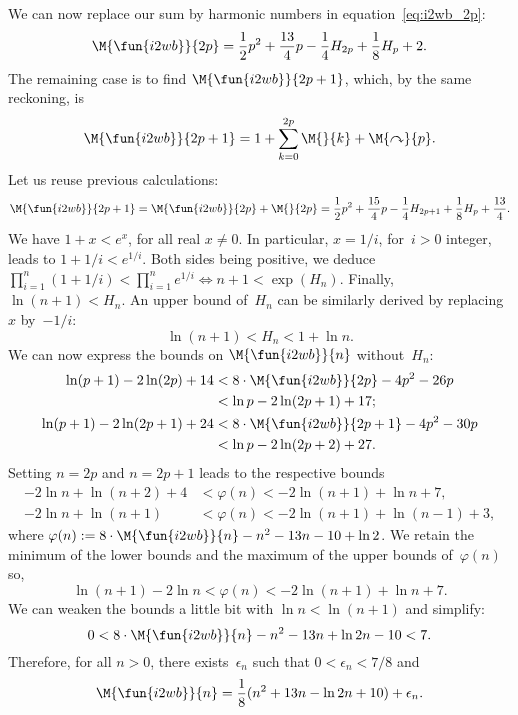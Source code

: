 We can now replace our sum by harmonic numbers in
equation~\eqref{eq:i2wb_2p}:
\begin{equation*}
\M{\fun{i2wb}}{2p}
  = \frac{1}{2}{p^2} + \frac{13}{4}{p} - \frac{1}{4}{H_{2p}}
    + \frac{1}{8}{H_p} + 2.
\end{equation*}
The remaining case is to find \(\M{\fun{i2wb}}{2p+1}\), which, by the
same reckoning, is
\begin{equation*}
\M{\fun{i2wb}}{2p+1}
  = 1 + \sum_{k=0}^{2p}{\M{}{k}} + \M{\curvearrowright}{p}.
\end{equation*}
Let us reuse previous calculations:
\begin{equation*}
\M{\fun{i2wb}}{2p+1}
   = \M{\fun{i2wb}}{2p} + \M{}{2p}
   = \frac{1}{2}{p^2} + \frac{15}{4}{p} - \frac{1}{4}{H_{2p+1}}
     + \frac{1}{8}{H_p} + \frac{13}{4}.
\end{equation*}
We have \(1 + x < e^x\), for all real \(x \neq 0\). In particular,
\(x=1/i\), for~\(i>0\) integer, leads to \(1 + 1/i < e^{1/i}\). Both
sides being positive, we deduce \(\prod_{i=1}^{n}(1+1/i) <
\prod_{i=1}^{n}{e^{1/i}} \Leftrightarrow n+1 < \exp(H_n)\). Finally,
\(\ln(n+1) < H_n\). An upper bound of~\(H_n\) can be similarly derived
by replacing~\(x\) by~\(-1/i\):
\begin{equation}
\ln(n+1) < H_n < 1 + \ln n.\label{ineq:Hn}
\end{equation}
We can now express the bounds on
\(\M{\fun{i2wb}}{n}\) without~\(H_n\):
\begin{align*}
\ln(p+1) - 2\ln(2p) + 14
&< 8 \cdot \M{\fun{i2wb}}{2p} - 4{p^2} - 26{p}\\
& < \ln p - 2\ln(2p+1) + 17;\\
\ln(p+1) - 2\ln(2p+1) + 24
&< 8 \cdot \M{\fun{i2wb}}{2p+1} - 4{p^2} - 30{p}\\
&< \ln{p} - 2\ln(2p+2) + 27.
\end{align*}
Setting \(n=2p\) and \(n=2p+1\) leads to the respective bounds
\begin{align*}
-2\ln n + \ln(n+2) + 4 &< \varphi(n) < -2\ln(n+1) + \ln n + 7,\\
-2\ln n + \ln(n+1)     &< \varphi(n) < -2\ln(n+1) + \ln(n-1) + 3,
\end{align*}
where \(\varphi(n) := 8 \cdot \M{\fun{i2wb}}{n} - n^2 - 13n - 10 + \ln
2\). We retain the minimum of the lower bounds and the maximum of the
upper bounds of~\(\varphi(n)\) so,
\begin{equation*}
\ln(n+1) - 2\ln n < \varphi(n) < -2\ln(n+1) + \ln n + 7.
\end{equation*}
We can weaken the bounds a little bit with \(\ln n < \ln(n+1)\) and
simplify:
\begin{equation*}
0 < 8 \cdot \M{\fun{i2wb}}{n} - n^2 - 13n + \ln 2n - 10 < 7.
\end{equation*}
Therefore, for all \(n > 0\), there exists~\(\epsilon_n\) such that
\(0 < \epsilon_n < 7/8\) and
\begin{equation}
\M{\fun{i2wb}}{n}
  = \frac{1}{8}(n^2 + 13n - \ln 2n + 10) + \epsilon_n.
\label{eq:ave_i2wb}
\end{equation}
